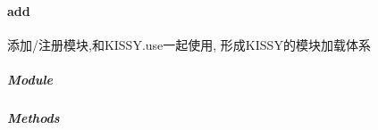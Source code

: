 \documentclass[letterpaper,10pt,english]{sphinxmanual}
\begin{document}
\paragraph{add}
\label{api/seed/loader/add:add}\label{api/seed/loader/add::doc}
\begin{DUlineblock}{0em}
\item[] 添加/注册模块,和KISSY.use一起使用, 形成KISSY的模块加载体系
\end{DUlineblock}


\subparagraph{Module}
\label{api/seed/loader/add:module}\begin{quote}

{\hyperref[api/seed/loader/index:module-Loader]{}}
\end{quote}


\subparagraph{Methods}
\label{api/seed/loader/add:methods}
\end{document}
